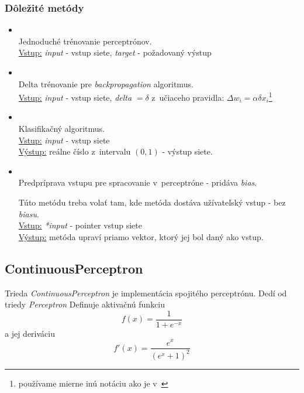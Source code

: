 \subsubsection{Dôležité metódy}
\begin{itemize}
\item {}
\\Jednoduché trénovanie perceptrónov.
\\ \underline{Vstup:} \textit{input} - vstup siete, \textit{target} - požadovaný výstup 
\item {}
\\Delta trénovanie pre \textit{backpropagation} algoritmus.
\\ \underline{Vstup:} \textit{input} - vstup siete, \textit{delta} $=\delta$ z~učiaceho pravidla: $\Delta w_i = \alpha\delta x_i$\footnote{používame mierne inú notáciu ako je v~\cite{haykin1999neural}} \cite[s. 74]{haykin1999neural}
\item {}
\\Klasifikačný algoritmus.
\\ \underline{Vstup:} \textit{input} - vstup siete
\\ \underline{Výstup:} reálne číslo z~intervalu $(0,1)$ - výstup siete.
\item {}
\\Predpríprava vstupu pre spracovanie v~perceptróne - pridáva \textit{bias}.

Túto metódu treba volať tam, kde metóda dostáva užívateľský vstup - bez \textit{biasu}.
\\ \underline{Vstup:} \textit{*input} - pointer vstup siete
\\ \underline{Výstup:} metóda upraví priamo vektor, ktorý jej bol daný ako vstup.
\end{itemize}

\subsection{ContinuousPerceptron}
Trieda \textit{ContinuousPerceptron} je implementácia spojitého perceptrónu. Dedí od triedy \textit{Perceptron} 
Definuje aktivačnú funkciu
$$f(x)=\frac{1}{1+e^{-x}} $$
a jej deriváciu
$$f'(x)=\frac{e^x}{(e^x+1)^2} $$

